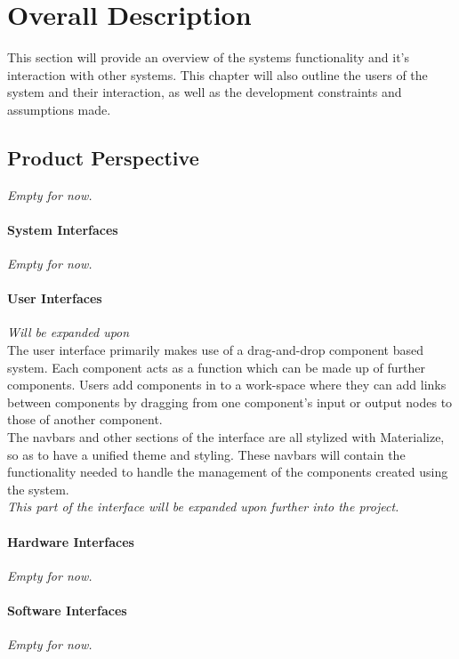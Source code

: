 \section{Overall Description}
	This section will provide an overview of the systems functionality and it's interaction with other systems. This chapter will also outline the users of the system and their interaction, as well as the development constraints and assumptions made.
	\subsection{Product Perspective}
	\textit{Empty for now.}

	\paragraph{System Interfaces}
	\textit{Empty for now.}
	\paragraph{User Interfaces}
	\textit{Will be expanded upon}\\
	The user interface primarily makes use of a drag-and-drop component based system. Each component acts as a function which can be made up of further components. Users add components in to a work-space where they can add links between components by dragging from one component's input or output nodes to those of another component.\\
	
	The navbars and other sections of the interface are all stylized with Materialize, so as to have a unified theme and styling. These navbars will contain the functionality needed to handle the management of the components created using the system.\\
	\textit{This part of the interface will be expanded upon further into the project.}
	
	
	\paragraph{Hardware Interfaces}
	\textit{Empty for now.}
	\paragraph{Software Interfaces}
	\textit{Empty for now.}
